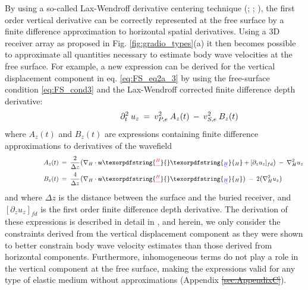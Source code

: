 \documentclass{article} %
\providecommand{\DIFaddtex}[1]{{\protect\color{blue}\uwave{#1}}} %
\providecommand{\DIFdeltex}[1]{{\protect\color{red}\sout{#1}}}                      %
\providecommand{\DIFaddbegin}{} %
\providecommand{\DIFaddend}{} %
\providecommand{\DIFdelbegin}{} %
\providecommand{\DIFdelend}{} %
\providecommand{\DIFadd}[1]{\texorpdfstring{\DIFaddtex{#1}}{#1}} %
\providecommand{\DIFdel}[1]{\texorpdfstring{\DIFdeltex{#1}}{}} %
\newcommand{\DIFscaledelfig}{0.5}
\newlength{\DIFdelgraphicswidth} %
\newlength{\DIFdelgraphicsheight} %
\newcommand{\DIFaddincludegraphics}[2][]{{\color{blue}\fbox{\DIFOincludegraphics[#1]{#2}}}} %
\newcommand{\DIFdelincludegraphics}[2][]{%
\sbox{\DIFdelgraphicsbox}{\DIFOincludegraphics[#1]{#2}}%
\settoboxwidth{\DIFdelgraphicswidth}{\DIFdelgraphicsbox} %
\settoboxtotalheight{\DIFdelgraphicsheight}{\DIFdelgraphicsbox} %
\scalebox{\DIFscaledelfig}{%
\parbox[b]{\DIFdelgraphicswidth}{\usebox{\DIFdelgraphicsbox}\\[-\baselineskip] \rule{\DIFdelgraphicswidth}{0em}}\llap{\resizebox{\DIFdelgraphicswidth}{\DIFdelgraphicsheight}{%
\setlength{\unitlength}{\DIFdelgraphicswidth}%
\begin{picture}(1,1)%
\thicklines\linethickness{2pt} %
{\color[rgb]{1,0,0}\put(0,0){\framebox(1,1){}}}%
{\color[rgb]{1,0,0}\put(0,0){\line( 1,1){1}}}%
{\color[rgb]{1,0,0}\put(0,1){\line(1,-1){1}}}%
\end{picture}%
}\hspace*{3pt}}} %
} %
\DeclareRobustCommand{\DIFaddbegin}{\DIFOaddbegin \let\includegraphics\DIFaddincludegraphics} %
\DeclareRobustCommand{\DIFaddend}{\DIFOaddend \let\includegraphics\DIFOincludegraphics} %
\DeclareRobustCommand{\DIFdelbegin}{\DIFOdelbegin \let\includegraphics\DIFdelincludegraphics} %
\DeclareRobustCommand{\DIFdelend}{\DIFOaddend \let\includegraphics\DIFOincludegraphics} %
\begin{document}
	\DIFaddend By using a so-called Lax-Wendroff derivative centering technique (\cite{lax1964difference}; \cite{blanch1997modified}; \cite{curtis2002volumetric}), the first order vertical derivative can be correctly represented at the free surface by a finite difference approximation to horizontal spatial derivatives. Using a 3D receiver array as proposed in Fig. \ref{fig:gradio_types}(a) it then becomes possible to approximate all quantities necessary to estimate body wave velocities at the free surface. For example, a new expression can be derived for the vertical displacement component in eq. \eqref{eq:FS_eq2a_3} by using the free-surface condition \eqref{eq:FS_cond3} and the Lax-Wendroff corrected finite difference depth derivative:
	\begin{align} \shoveright \shoveright \shoveright \shoveright \shoveright \shoveright 
		\partial_{t}^{2} \: u_{z} \: =  \: v_{P,e}^{2} \: A_{z}(t) \: - \: v_{S,e}^{2} \: B_{z}(t)  
		\label{eq:freeSurfT}   
	\end{align} 
	where $A_{z}(t)$ and $B_{z}(t)$ are expressions containing finite difference approximations to derivatives of the wavefield
	\begin{align} \shoveright \shoveright \shoveright \shoveright \shoveright \shoveright 
		A_{z}(t)  	\: &= \:   \frac{2}{\Delta z} \big(\nabla_{H} \cdot \bm{u}\DIFdelbegin \DIFdel{^{H} }\DIFdelend \DIFaddbegin \DIFadd{_{H} }\DIFaddend + [\partial_{z} u_{z}]_{fd} \big) \: - \: \nabla^{2}_{H} u_{z} \label{eq:Az} \\ 
		B_{z}(t) 	\: &= \:   \frac{4}{\Delta z} \big(\nabla_{H} \cdot \bm{u}\DIFdelbegin \DIFdel{^{H}}\DIFdelend \DIFaddbegin \DIFadd{_{H}}\DIFaddend \big) \: - \: 2\big(\nabla^{2}_{H}u_{z}\big)
		\label{eq:Bz}   
	\end{align}
	and where $\Delta z$ is the distance between the surface and the buried receiver, and $[\partial_{z} u_{z}]_{fd}$ is the first order finite difference depth derivative. The derivation of these expressions is described in detail in \textcite{curtis2002volumetric}, and herein, we only consider the constraints derived from the vertical displacement component as they were shown to better constrain body wave velocity estimates than those derived from horizontal components. Furthermore, inhomogeneous terms do not play a role in the vertical component at the free surface, making the expressions valid for any type of elastic medium without approximations (Appendix \DIFdelbegin \DIFdel{\ref{sec:AppendixC}}\DIFdelend \DIFaddbegin \DIFadd{\ref{sec:AppendixE}}\DIFaddend ). \\
\end{document}
